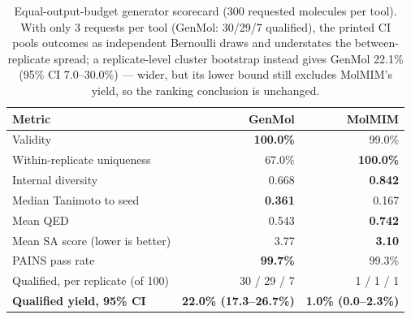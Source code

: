 \documentclass{article}
\begin{document}
\begin{table}[t]
  \caption{Equal-output-budget generator scorecard (300 requested molecules per tool). With only 3 requests per tool (GenMol: 30/29/7 qualified), the printed CI pools outcomes as independent Bernoulli draws and understates the between-replicate spread; a replicate-level cluster bootstrap instead gives GenMol 22.1\% (95\% CI 7.0--30.0\%) --- wider, but its lower bound still excludes MolMIM's yield, so the ranking conclusion is unchanged.}
  \label{tab:generator}
  \centering
  \footnotesize
  \begin{tabular}{lrr}
    \toprule
    Metric & GenMol & MolMIM \\
    \midrule
    Validity & \textbf{100.0\%} & 99.0\% \\
    Within-replicate uniqueness & 67.0\% & \textbf{100.0\%} \\
    Internal diversity & 0.668 & \textbf{0.842} \\
    Median Tanimoto to seed & \textbf{0.361} & 0.167 \\
    Mean QED & 0.543 & \textbf{0.742} \\
    Mean SA score (lower is better) & 3.77 & \textbf{3.10} \\
    PAINS pass rate & \textbf{99.7\%} & 99.3\% \\
    Qualified, per replicate (of 100) & 30 / 29 / 7 & 1 / 1 / 1 \\
    \textbf{Qualified yield, 95\% CI} & \textbf{22.0\% (17.3--26.7\%)} & \textbf{1.0\% (0.0--2.3\%)} \\
    \bottomrule
  \end{tabular}
\end{table}
\end{document}
